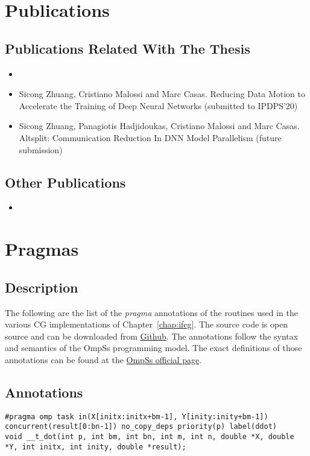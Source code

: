 \begin{appendices}
\chapter{Publications}
\section{Publications Related With The Thesis}
\begin{itemize}
	\item {}
	\item Sicong Zhuang, Cristiano Malossi and Marc Casas. Reducing Data Motion 
        to Accelerate the Training of Deep Neural Networks (submitted to IPDPS'20)
	\item Sicong Zhuang, Panagiotis Hadjidoukas, Cristiano Malossi and Marc 
        Casas. Altsplit: Communication Reduction In DNN Model Parallelism 
        (future submission)
\end{itemize}

\section{Other Publications}
\begin{itemize}
    \item {}
\end{itemize}

\chapter{Pragmas}
\section{Description}
The following are the list of the \textit{pragma} annotations of the routines 
used in the various CG implementations of Chapter~\ref{chap:ifcg}. The 
source code is open source and can be downloaded from
\href{git@github.com:zhuangsc/IFCG.git}{Github}. The annotations follow the 
syntax and semantics of the OmpSs programming model. The exact definitions 
of those annotations can be found at the
\href{https://pm.bsc.es/ftp/ompss/doc/spec/}{OmpSs official page}.

\section{Annotations}
\begin{lstlisting}
#pragma omp task in(X[initx:initx+bm-1], Y[inity:inity+bm-1]) concurrent(result[0:bn-1]) no_copy_deps priority(p) label(ddot) 
void __t_dot(int p, int bm, int bn, int m, int n, double *X, double *Y, int initx, int inity, double *result); 


\end{lstlisting}
\end{appendices}
